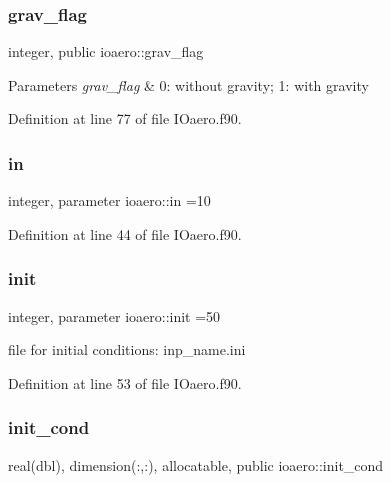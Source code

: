 \subsubsection{\texorpdfstring{grav\+\_\+flag}{grav\_flag}}
{\footnotesize\ttfamily integer, public ioaero\+::grav\+\_\+flag}


\begin{DoxyParams}{Parameters}
{\em grav\+\_\+flag} & 0\+: without gravity; 1\+: with gravity \\
\hline
\end{DoxyParams}


Definition at line 77 of file I\+Oaero.\+f90.

\mbox{\label{namespaceioaero_a09d53f15b1a2c723ad2b4df01c16bccc}} 
\subsubsection{\texorpdfstring{in}{in}}
{\footnotesize\ttfamily integer, parameter ioaero\+::in =10\hspace{0.3cm}{\ttfamily [private]}}



Definition at line 44 of file I\+Oaero.\+f90.

\mbox{\label{namespaceioaero_afb3050696f2887599d4083672103b6e7}} 
\subsubsection{\texorpdfstring{init}{init}}
{\footnotesize\ttfamily integer, parameter ioaero\+::init =50\hspace{0.3cm}{\ttfamily [private]}}



file for initial conditions\+: inp\+\_\+name.\+ini 



Definition at line 53 of file I\+Oaero.\+f90.

\mbox{\label{namespaceioaero_ad88d83709eb2f4596a89098db11ba770}} 
\subsubsection{\texorpdfstring{init\+\_\+cond}{init\_cond}}
{\footnotesize\ttfamily real(dbl), dimension(\+:,\+:), allocatable, public ioaero\+::init\+\_\+cond}



